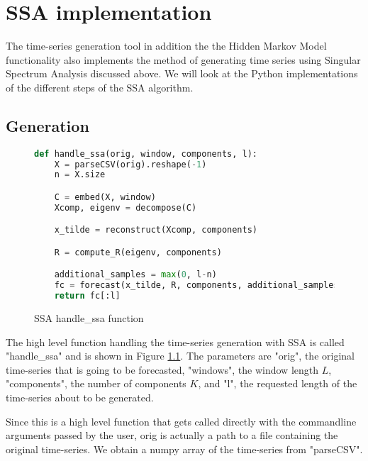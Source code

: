 
\chapter{SSA implementation}\label{chapter:ssa-impl}

The time-series generation tool in addition the the Hidden Markov Model functionality also implements the method of generating time series using Singular Spectrum Analysis discussed above. We will look at the Python implementations of the different steps of the SSA algorithm. 

\section{Generation}

\begin{figure}
\begin{singlespace}
\begin{lstlisting}[language=Python]
def handle_ssa(orig, window, components, l):
    X = parseCSV(orig).reshape(-1)
    n = X.size

    C = embed(X, window)
    Xcomp, eigenv = decompose(C)

    x_tilde = reconstruct(Xcomp, components)

    R = compute_R(eigenv, components)

    additional_samples = max(0, l-n)
    fc = forecast(x_tilde, R, components, additional_samples)
    return fc[:l]
\end{lstlisting}
\end{singlespace}
\caption{SSA handle\_ssa function}    
\label{fig:ssa-handle}
\end{figure}

The high level function handling the time-series generation with SSA is called "handle\_ssa" and is shown in Figure \ref{fig:ssa-handle}. The parameters are "orig", the original time-series that is going to be forecasted, "windows", the window length $L$, "components", the number of components $K$, and "l", the requested length of the time-series about to be generated. 

Since this is a high level function that gets called directly with the commandline arguments passed by the user, orig is actually a path to a file containing the original time-series. We obtain a numpy array of the time-series from "parseCSV". 

